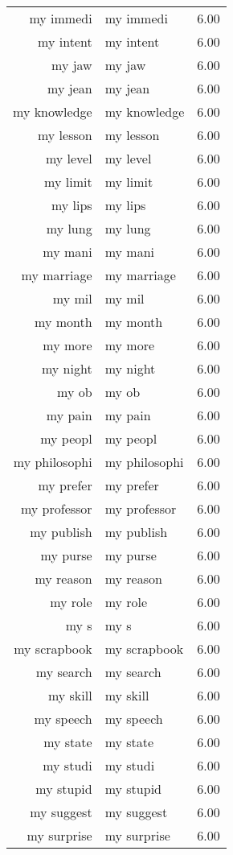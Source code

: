 \begin{table}[ht]
\begin{tabular}{rlr}
  my immedi & my immedi & 6.00 \\ 
  my intent & my intent & 6.00 \\ 
  my jaw & my jaw & 6.00 \\ 
  my jean & my jean & 6.00 \\ 
  my knowledge & my knowledge & 6.00 \\ 
  my lesson & my lesson & 6.00 \\ 
  my level & my level & 6.00 \\ 
  my limit & my limit & 6.00 \\ 
  my lips & my lips & 6.00 \\ 
  my lung & my lung & 6.00 \\ 
  my mani & my mani & 6.00 \\ 
  my marriage & my marriage & 6.00 \\ 
  my mil & my mil & 6.00 \\ 
  my month & my month & 6.00 \\ 
  my more & my more & 6.00 \\ 
  my night & my night & 6.00 \\ 
  my ob & my ob & 6.00 \\ 
  my pain & my pain & 6.00 \\ 
  my peopl & my peopl & 6.00 \\ 
  my philosophi & my philosophi & 6.00 \\ 
  my prefer & my prefer & 6.00 \\ 
  my professor & my professor & 6.00 \\ 
  my publish & my publish & 6.00 \\ 
  my purse & my purse & 6.00 \\ 
  my reason & my reason & 6.00 \\ 
  my role & my role & 6.00 \\ 
  my s & my s & 6.00 \\ 
  my scrapbook & my scrapbook & 6.00 \\ 
  my search & my search & 6.00 \\ 
  my skill & my skill & 6.00 \\ 
  my speech & my speech & 6.00 \\ 
  my state & my state & 6.00 \\ 
  my studi & my studi & 6.00 \\ 
  my stupid & my stupid & 6.00 \\ 
  my suggest & my suggest & 6.00 \\ 
  my surprise & my surprise & 6.00 \\ 

\end{tabular}
\end{table}
